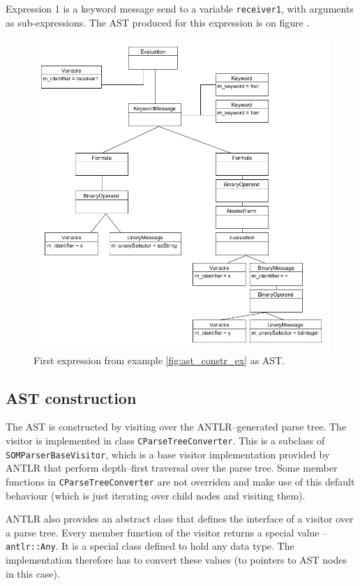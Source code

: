 \documentclass[thesis=M,english]{FITthesis}[2019/12/23]
\begin{document}
Expression 1 is a keyword message send to a variable \texttt{receiver1}, with arguments as sub-expressions. The AST produced for this expression is
on figure .

\begin{figure}[h!]
	\centering
	\includegraphics[width=\textwidth]{media/exp_ast_1.png}
	\caption{First expression from example \ref{fig:ast_constr_ex} as AST.}
	\label{fig:ast_const_ex_1}
\end{figure}

\subsection{AST construction}
The AST is constructed by visiting over the ANTLR--generated parse tree. The visitor is implemented in class \texttt{CParseTreeConverter}. This is a subclass
of \texttt{SOMParserBaseVisitor}, which is a base visitor implementation provided by ANTLR that perform depth--first traversal over the parse tree. Some member
functions in \texttt{CParseTreeConverter} are not overriden and make use of this default behaviour (which is just iterating over child nodes and visiting them).

ANTLR also provides an abstract class that defines the interface of a visitor over a parse tree. Every member function of the visitor returns a special value --
\texttt{antlr::Any}. It is a special class defined to hold any data type. The implementation therefore has to convert these values (to pointers to AST nodes
in this case). 
\end{document}
